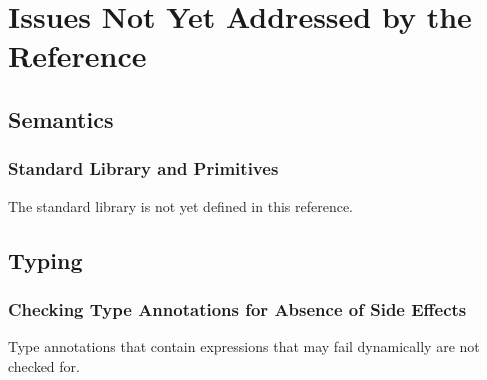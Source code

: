  

\chapter{Issues Not Yet Addressed by the Reference\label{appendix:MissingTransliteration}}
\section{Semantics}

\subsection{Standard Library and Primitives}

The standard library is not yet defined in this reference.


\section{Typing}

\subsection{Checking Type Annotations for Absence of Side Effects}
Type annotations that contain expressions that may fail dynamically are not checked for.


